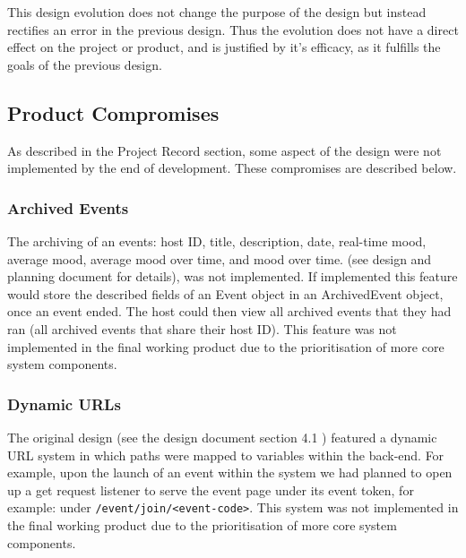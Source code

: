 \documentclass[9pt, titlepage]{extarticle}
\begin{document}
This design evolution does not change the purpose of the design but instead rectifies an error in the previous design. Thus the evolution does not have a direct effect on the project or product, and is justified by it's efficacy, as it fulfills the goals of the previous design.

\subsection{Product Compromises}

As described in the Project Record section, some aspect of the design were not implemented by the end of development. These compromises are described below.

\subsubsection{Archived Events}

The archiving of an events: host ID, title, description, date, real-time mood, average mood, average mood over time, and mood over time. (see design and planning document \cite{design-and-planning} for details), was not implemented. If implemented this feature would store the described fields of an Event object in an ArchivedEvent object, once an event ended. The host could then view all archived events that they had ran (all archived events that share their host ID). This feature was not implemented in the final working product due to the prioritisation of more core system components. %


\subsubsection{Dynamic URLs}

The original design (see the design document section 4.1 \cite{design-and-planning}) featured a dynamic URL system in which paths were mapped to variables within the back-end. For example, upon the launch of an event within the system we had planned to open up a get request listener to serve the event page under its event token, for example: under \texttt{/event/join/<event-code>}. This system was not implemented in the final working product due to the prioritisation of more core system components.%
\end{document}
